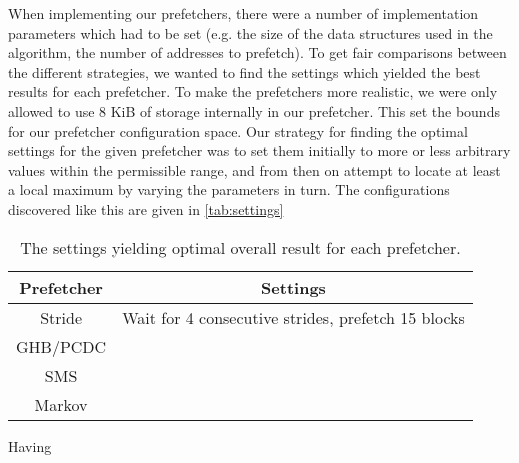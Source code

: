 When implementing our prefetchers, there were a number of
implementation parameters which had to be set (e.g. the size of the
data structures used in the algorithm, the number of addresses to
prefetch). To get fair comparisons between the different strategies,
we wanted to find the settings which yielded the best results for each
prefetcher. To make the prefetchers more realistic, we were only
allowed to use 8 KiB of storage internally in our prefetcher. This set
the bounds for our prefetcher configuration space. Our strategy for
finding the optimal settings for the given prefetcher was to set them
initially to more or less arbitrary values within the permissible
range, and from then on attempt to locate at least a local maximum by
varying the parameters in turn. The configurations discovered like
this are given in \autoref{tab:settings}

\begin{table}[htbp]
  \centering
  \begin{tabular}{|c|c|}
    \hline
    \textbf{Prefetcher} & \textbf{Settings} \\ \hline
    Stride & Wait for 4 consecutive strides, prefetch 15 blocks \\ \hline
    GHB/PCDC &  \\ \hline
    SMS & \\ \hline
    Markov & \\ \hline
  \end{tabular}
  \caption{The settings yielding optimal overall result for each prefetcher.}
  \label{tab:settings}
\end{table}


Having 


